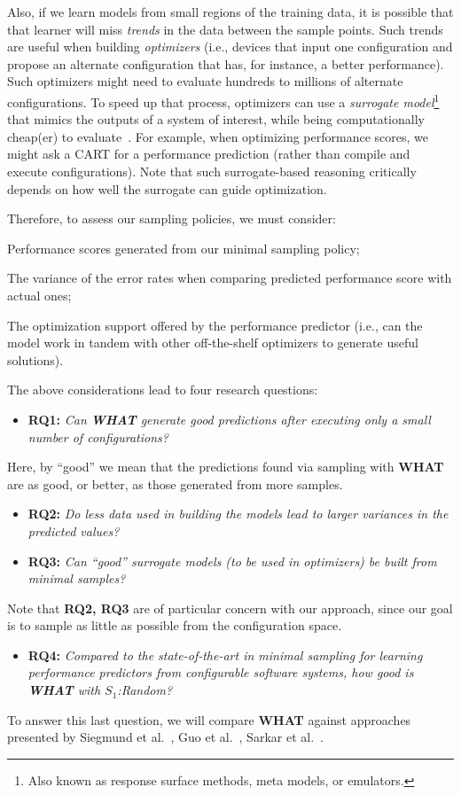 \documentclass{sig-alternative}
\newcommand{\bi}{\begin{itemize}}%
\newcommand{\ei}{\end{itemize}}
\newcommand{\what}{{\bf WHAT }}
\begin{document}
Also, if we learn models from small regions of the training data,
it is  possible that that learner will miss {\em trends} in the data
between the sample points. Such trends are useful when building {\em optimizers}
(i.e., devices that input one configuration and propose an alternate
configuration that has, for instance,  a better performance). Such optimizers might
need to evaluate hundreds to millions of alternate configurations. 
To speed up that process, optimizers can use a {\em surrogate model}\footnote{Also known as response surface methods, meta models, or emulators.}
that  mimics the outputs of a system of interest, while being computationally cheap(er) to evaluate~\cite{loshchilov13}. For example, when optimizing
performance scores, we might ask a CART  for a performance
prediction (rather than compile and execute
configurations).  Note that such surrogate-based
reasoning critically depends on how well the surrogate can guide optimization.


Therefore, to assess our sampling policies, we must consider:
\begin{compactitem}
\item Performance scores generated from our minimal sampling policy;
\item The variance of the error rates when comparing predicted performance score with actual ones;
\item The optimization support offered by the performance predictor (i.e., can the model work in tandem with other off-the-shelf optimizers to generate useful solutions).
\end{compactitem}
The above considerations lead to four research questions:
\bi
\item {\bf RQ1:} {\em Can  \what generate good predictions after
executing only a small number of configurations?}
\ei
Here, by ``good'' we mean that the predictions found via sampling with \what are as good, or better,
as those generated from more samples.
\bi
\item {\bf RQ2:} {\em
Do less data used in building the models lead to larger variances in the predicted values?}
\item {\bf RQ3:} {\em
Can ``good'' surrogate models (to be used in optimizers)
be built from minimal samples?}
\ei
Note that {\bf RQ2, RQ3} are of particular concern with our approach,
since our goal is to sample as little as possible from the configuration space.
\bi
\item {\bf RQ4:} {\em Compared to the state-of-the-art in minimal sampling for
learning performance predictors from configurable software systems, how good is \what with $S_1$:Random?}
\ei
To answer this last question, we will compare \what 
          against approaches presented by Siegmund et al.~\cite{siegmund2012predicting}, Guo et al.~\cite{guo2013variability}, Sarkar et al.~\cite{sarkar2015cost}.
 
\end{document}
